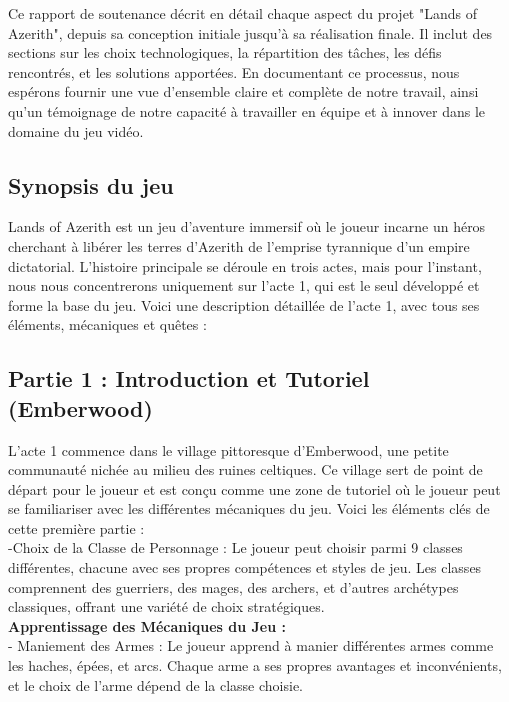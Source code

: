 Ce rapport de soutenance décrit en détail chaque aspect du projet "Lands of Azerith", depuis sa conception initiale jusqu'à sa réalisation finale. Il inclut des sections sur les choix technologiques, la répartition des tâches, les défis rencontrés, et les solutions apportées. En documentant ce processus, nous espérons fournir une vue d'ensemble claire et complète de notre travail, ainsi qu'un témoignage de notre capacité à travailler en équipe et à innover dans le domaine du jeu vidéo.






\subsection{Synopsis du jeu}

Lands of Azerith est un jeu d'aventure immersif où le joueur incarne un héros cherchant à libérer les terres d'Azerith de l'emprise tyrannique d'un empire dictatorial.
L'histoire principale se déroule en trois actes, mais pour l'instant, nous nous concentrerons uniquement sur l'acte 1, qui est le seul développé et forme la base du jeu.
Voici une description détaillée de l'acte 1, avec tous ses éléments, mécaniques et quêtes :

\subsection*{Partie 1 : Introduction et Tutoriel (Emberwood)}

L'acte 1 commence dans le village pittoresque d'Emberwood, une petite communauté nichée au milieu des ruines celtiques.
Ce village sert de point de départ pour le joueur et est conçu comme une zone de tutoriel où le joueur peut se familiariser avec les différentes mécaniques du jeu.
Voici les éléments clés de cette première partie :
\\

-Choix de la Classe de Personnage : Le joueur peut choisir parmi 9 classes différentes, chacune avec ses propres compétences et styles de jeu. Les classes comprennent des guerriers, des mages, des archers, et d'autres archétypes classiques, offrant une variété de choix stratégiques.
\\

\textbf{Apprentissage des Mécaniques du Jeu : }
\\

- Maniement des Armes : Le joueur apprend à manier différentes armes comme les haches, épées, et arcs.
Chaque arme a ses propres avantages et inconvénients, et le choix de l'arme dépend de la classe choisie.
\\

